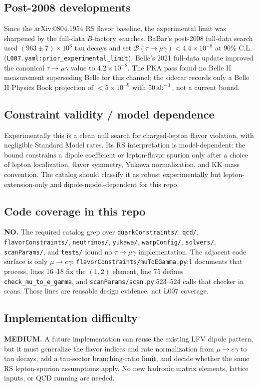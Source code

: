 \subsection*{Post-2008 developments}
Since the arXiv:0804.1954 RS flavor baseline, the experimental limit was
sharpened by the full-data \(B\)-factory searches.  BaBar's post-2008
full-data search used \((963\pm7)\times10^6\) tau decays and set
\(\mathcal{B}(\tau\to\mu\gamma)<4.4\times10^{-8}\) at \(90\%\) C.L.
(\texttt{L007.yaml:prior\_experimental\_limit}).  Belle's 2021 full-data update
improved the canonical \(\tau\to\mu\gamma\) value to \(4.2\times10^{-8}\).  The
PKA pass found no Belle II measurement superseding Belle for this channel; the
sidecar records only a Belle II Physics Book projection of
\(<5\times10^{-9}\) with \(50\,{\rm ab}^{-1}\), not a current bound.

\subsection*{Constraint validity / model dependence}
Experimentally this is a clean null search for charged-lepton flavor violation,
with negligible Standard Model rates.  Its RS interpretation is model-dependent:
the bound constrains a dipole coefficient or lepton-flavor spurion only after a
choice of lepton localization, flavor symmetry, Yukawa normalization, and KK
mass convention.  The catalog should classify it as robust experimentally but
lepton-extension-only and dipole-model-dependent for this repo.

\subsection*{Code coverage in this repo}
\textbf{NO.}  The required catalog grep over \texttt{quarkConstraints/}, \texttt{qcd/},
\texttt{flavorConstraints/}, \texttt{neutrinos/}, \texttt{yukawa/},
\texttt{warpConfig/}, \texttt{solvers/}, \texttt{scanParams/}, and
\texttt{tests/} found no \(\tau\to\mu\gamma\) implementation.  The adjacent
code surface is only \(\mu\to e\gamma\): \texttt{flavorConstraints/muToEGamma.py}:1
documents that process, lines 16--18 fix the \((1,2)\) element, line 75 defines
\texttt{check\_mu\_to\_e\_gamma}, and \texttt{scanParams/scan.py}:523--524 calls
that checker in scans.  Those lines are reusable design evidence, not L007
coverage.

\subsection*{Implementation difficulty}
\textbf{MEDIUM.}  A future implementation can reuse the existing LFV dipole
pattern, but it must generalize the flavor indices and rate normalization from
\(\mu\to e\gamma\) to tau decays, add a tau-sector branching-ratio limit, and
decide whether the same RS lepton-spurion assumptions apply.  No new hadronic
matrix elements, lattice inputs, or QCD running are needed.

